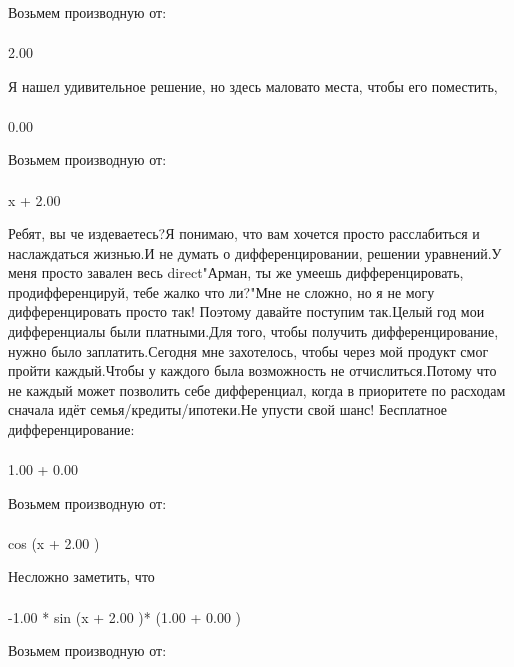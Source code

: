 Возьмем производную от:
\begin{gather}
\end{gather}
\begin{}
2.00 \\
\end{}
Я нашел удивительное решение, но здесь маловато места, чтобы его поместить, 
\begin{gather}
\end{gather}
\begin{}
0.00 \\
\end{}
Возьмем производную от:
\begin{gather}
\end{gather}
\begin{}
x + 2.00 \\
\end{}
Ребят, вы че издеваетесь?Я понимаю, что вам хочется просто расслабиться и наслаждаться жизнью.И не думать о дифференцировании, решении уравнений.У меня просто завален весь direct"Арман, ты же умеешь дифференцировать, продифференцируй, тебе жалко что ли?"Мне не сложно, но я не могу дифференцировать просто так! Поэтому давайте поступим так.Целый год мои дифференциалы были платными.Для того, чтобы получить дифференцирование, нужно было заплатить.Сегодня мне захотелось, чтобы через мой продукт смог пройти каждый.Чтобы у каждого была возможность не отчислиться.Потому что не каждый может позволить себе дифференциал, когда в приоритете по расходам сначала идёт семья/кредиты/ипотеки.Не упусти свой шанс! Бесплатное дифференцирование: 
\begin{gather}
\end{gather}
\begin{}
1.00 + 0.00 \\
\end{}
Возьмем производную от:
\begin{gather}
\end{gather}
\begin{}
cos (x + 2.00 )\\
\end{}
Несложно заметить, что
\begin{gather}
\end{gather}
\begin{}
-1.00 * sin (x + 2.00 )* (1.00 + 0.00 )\\
\end{}
Возьмем производную от:
\begin{gather}
\end{gather}
